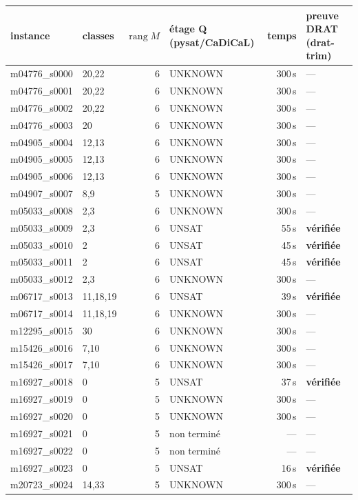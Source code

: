 \begin{longtable}{llrlrl}\toprule instance & classes & $\operatorname{rang}M$ & \'etage Q (pysat/CaDiCaL) & temps & preuve DRAT (drat-trim)\\\midrule\endhead
m04776\_s0000 & 20,22 & 6 & UNKNOWN & 300\,s & ---\\
m04776\_s0001 & 20,22 & 6 & UNKNOWN & 300\,s & ---\\
m04776\_s0002 & 20,22 & 6 & UNKNOWN & 300\,s & ---\\
m04776\_s0003 & 20 & 6 & UNKNOWN & 300\,s & ---\\
m04905\_s0004 & 12,13 & 6 & UNKNOWN & 300\,s & ---\\
m04905\_s0005 & 12,13 & 6 & UNKNOWN & 300\,s & ---\\
m04905\_s0006 & 12,13 & 6 & UNKNOWN & 300\,s & ---\\
m04907\_s0007 & 8,9 & 5 & UNKNOWN & 300\,s & ---\\
m05033\_s0008 & 2,3 & 6 & UNKNOWN & 300\,s & ---\\
m05033\_s0009 & 2,3 & 6 & UNSAT & 55\,s & \textbf{v\'erifi\'ee}\\
m05033\_s0010 & 2 & 6 & UNSAT & 45\,s & \textbf{v\'erifi\'ee}\\
m05033\_s0011 & 2 & 6 & UNSAT & 45\,s & \textbf{v\'erifi\'ee}\\
m05033\_s0012 & 2,3 & 6 & UNKNOWN & 300\,s & ---\\
m06717\_s0013 & 11,18,19 & 6 & UNSAT & 39\,s & \textbf{v\'erifi\'ee}\\
m06717\_s0014 & 11,18,19 & 6 & UNKNOWN & 300\,s & ---\\
m12295\_s0015 & 30 & 6 & UNKNOWN & 300\,s & ---\\
m15426\_s0016 & 7,10 & 6 & UNKNOWN & 300\,s & ---\\
m15426\_s0017 & 7,10 & 6 & UNKNOWN & 300\,s & ---\\
m16927\_s0018 & 0 & 5 & UNSAT & 37\,s & \textbf{v\'erifi\'ee}\\
m16927\_s0019 & 0 & 5 & UNKNOWN & 300\,s & ---\\
m16927\_s0020 & 0 & 5 & UNKNOWN & 300\,s & ---\\
m16927\_s0021 & 0 & 5 & non termin\'e & --- & ---\\
m16927\_s0022 & 0 & 5 & non termin\'e & --- & ---\\
m16927\_s0023 & 0 & 5 & UNSAT & 16\,s & \textbf{v\'erifi\'ee}\\
m20723\_s0024 & 14,33 & 5 & UNKNOWN & 300\,s & ---\\

\end{longtable}
